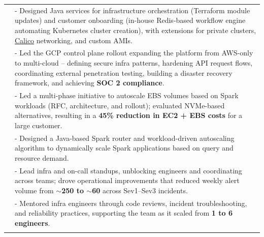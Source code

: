 \documentclass[a4paper,10pt]{extarticle}
\begin{document}
\begin{tabularx}{\linewidth}{ l | X }
& \small{- Designed Java services for infrastructure orchestration (Terraform module updates) and customer onboarding (in-house Redis-based workflow engine automating Kubernetes cluster creation), with extensions for private clusters, \href{https://www.tigera.io/project-calico/}{Calico} networking, and custom AMIs.}\\
& \small{- Led the GCP control plane rollout expanding the platform from AWS-only to multi-cloud -- defining secure infra patterns, hardening API request flows, coordinating external penetration testing, building a disaster recovery framework, and achieving \textbf{SOC 2 compliance}.}\\
& \small{- Led a multi-phase initiative to autoscale EBS volumes based on Spark workloads (RFC, architecture, and rollout); evaluated NVMe-based alternatives, resulting in a \textbf{45\% reduction in EC2 + EBS costs} for a large customer.}\\
& \small{- Designed a Java-based Spark router and workload-driven autoscaling algorithm to dynamically scale Spark applications based on query and resource demand.}\\
& \small{- Lead infra and on-call standups, unblocking engineers and coordinating across teams; drove operational improvements that reduced weekly alert volume from \textbf{$\sim$250 to $\sim$60} across Sev1--Sev3 incidents.}\\
& \small{- Mentored infra engineers through code reviews, incident troubleshooting, and reliability practices, supporting the team as it scaled from \textbf{1 to 6 engineers}.}\\
\multicolumn{2}{c}{}\\




\end{tabularx}
\end{document}
